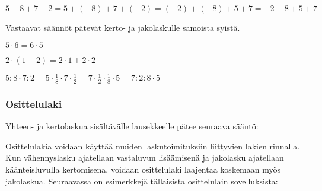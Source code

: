 \begin{esimerkki}
$5-8+7-2=5+(-8)+7+(-2)=(-2)+(-8)+5+7=-2-8+5+7$
\end{esimerkki}

Vastaavat säännöt pätevät kerto- ja jakolaskulle samoista syistä.


\begin{esimerkki}

$5 \cdot 6 = 6 \cdot 5$
 
 $2 \cdot (1+2) = 2 \cdot 1 + 2 \cdot 2$
\end{esimerkki}



\begin{esimerkki}
$5:8\cdot 7:2=5\cdot\frac18\cdot 7\cdot\frac12=7\cdot \frac12\cdot\frac18\cdot 5=7:2:8\cdot 5$
\end{esimerkki}

\subsubsection*{Osittelulaki}

Yhteen- ja kertolaskua sisältävälle lausekkeelle pätee seuraava sääntö:


Osittelulakia voidaan käyttää muiden laskutoimituksiin liittyvien lakien rinnalla. Kun vähennyslasku ajatellaan vastaluvun lisäämisenä ja jakolasku ajatellaan käänteisluvulla kertomisena, voidaan osittelulaki laajentaa koskemaan myös jakolaskua. Seuraavassa on esimerkkejä tällaisista osittelulain sovelluksista:

